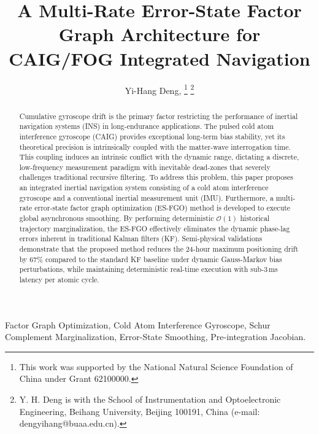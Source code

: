\documentclass[journal]{IEEEtran}
\title{A Multi-Rate Error-State Factor Graph Architecture for CAIG/FOG Integrated Navigation}
\author{Yi-Hang Deng, \IEEEmembership{Student Member, IEEE}
	\thanks{This work was supported by the National Natural Science Foundation of China under Grant 62100000.}
	\thanks{Y. H. Deng is with the School of Instrumentation and Optoelectronic Engineering, Beihang University, Beijing 100191, China (e-mail: dengyihang@buaa.edu.cn).}}
\begin{document}
	\maketitle
	
	\begin{abstract}
		Cumulative gyroscope drift is the primary factor restricting the performance of inertial navigation systems (INS) in long-endurance applications. The pulsed cold atom interference gyroscope (CAIG) provides exceptional long-term bias stability, yet its theoretical precision is intrinsically coupled with the matter-wave interrogation time. This coupling induces an intrinsic conflict with the dynamic range, dictating a discrete, low-frequency measurement paradigm with inevitable dead-zones that severely challenges traditional recursive filtering. To address this problem, this paper proposes an integrated inertial navigation system consisting of a cold atom interference gyroscope and a conventional inertial measurement unit (IMU). Furthermore, a multi-rate error-state factor graph optimization (ES-FGO) method is developed to execute global asynchronous smoothing. By performing deterministic $\mathcal{O}(1)$ historical trajectory marginalization, the ES-FGO effectively eliminates the dynamic phase-lag errors inherent in traditional Kalman filters (KF). Semi-physical validations demonstrate that the proposed method reduces the 24-hour maximum positioning drift by 67\% compared to the standard KF baseline under dynamic Gauss-Markov bias perturbations, while maintaining deterministic real-time execution with sub-3\,ms latency per atomic cycle.
	\end{abstract}
	
	\begin{IEEEkeywords}
		Factor Graph Optimization, Cold Atom Interference Gyroscope, Schur Complement Marginalization, Error-State Smoothing, Pre-integration Jacobian.
	\end{IEEEkeywords}
	
			
\end{document}
